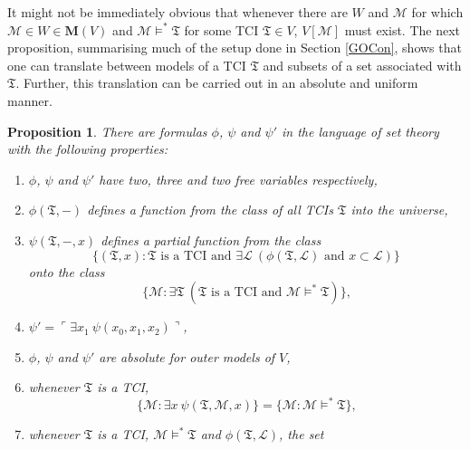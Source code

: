 \documentclass[12pt, twoside]{memoir}
\numberwithin{equation}{section}
\newtheorem{prop}[thm]{Proposition}
\theoremstyle{definition}
\theoremstyle{remark}
\theoremstyle{definition}
\theoremstyle{definition}
\theoremstyle{definition}
\theoremstyle{remark}
\begin{document}
It might not be immediately obvious that whenever there are $W$ and $\mathcal{M}$ for which $\mathcal{M} \in W \in \mathbf{M}(V)$ and $\mathcal{M} \models^* \mathfrak{T}$ for some TCI $\mathfrak{T} \in V$, $V[\mathcal{M}]$ must exist. The next proposition, summarising much of the setup done in Section \ref{GOCon}, shows that one can translate between models of a TCI $\mathfrak{T}$ and subsets of a set associated with $\mathfrak{T}$. Further, this translation can be carried out in an absolute and uniform manner.

\begin{prop}\label{prop322}
There are formulas $\phi$, $\psi$ and $\psi'$ in the language of set theory with the following properties: 
\begin{enumerate}[label=(\arabic*)]
    \item $\phi$, $\psi$ and $\psi'$ have two, three and two free variables respectively,
    \item\label{9252} $\phi(\mathfrak{T}, -)$ defines a function from the class of all TCIs $\mathfrak{T}$ into the universe,
    \item\label{9253} $\psi(\mathfrak{T}, -, x)$ defines a partial function from the class
    \begin{equation*}
        \{(\mathfrak{T}, x) : \mathfrak{T} \text{ is a TCI and } \exists \mathcal{L} \ (\phi(\mathfrak{T}, \mathcal{L}) \text{ and } x \subset \mathcal{L})\}
    \end{equation*}
    onto the class
    \begin{equation*}
        \{\mathcal{M} : \exists \mathfrak{T} \ (\mathfrak{T} \text{ is a TCI and } \mathcal{M} \models^* \mathfrak{T})\} \text{,}
    \end{equation*}
    \item\label{9254} $\psi' = \ulcorner \exists x_1 \ \psi(x_0, x_1, x_2)  \urcorner$,
    \item\label{9255} $\phi$, $\psi$ and $\psi'$ are absolute for outer models of $V$,
    \item\label{3245} whenever $\mathfrak{T}$ is a TCI,
    \begin{equation*}
        \{\mathcal{M} : \exists x \ \psi(\mathfrak{T}, \mathcal{M}, x)\} = \{\mathcal{M} : \mathcal{M} \models^* \mathfrak{T}\} \text{,}
    \end{equation*}
    \item\label{3245'} whenever $\mathfrak{T}$ is a TCI, $\mathcal{M} \models^* \mathfrak{T}$ and $\phi(\mathfrak{T}, \mathcal{L})$, the set
    \begin{equation*}

\end{equation*}
\end{enumerate}
\end{prop}
\end{document}
